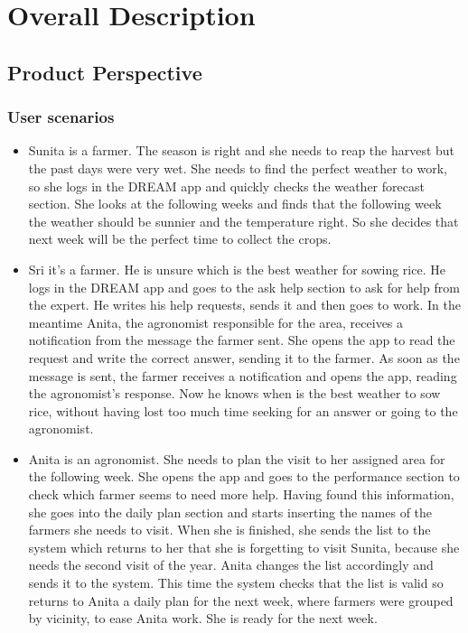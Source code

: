 \documentclass{article}
\begin{document}
\newpage





\section{Overall Description}

\subsection{Product Perspective}

\subsubsection{User scenarios}

    \begin{itemize}
        \item Sunita is a farmer. The season is right and she needs to reap the harvest but the past days were very wet. She needs to find the perfect weather to work, so she logs in the DREAM app and quickly checks the weather forecast section. She looks at the following weeks and finds that the following week the weather should be sunnier and the temperature right. So she decides that next week will be the perfect time to collect the crops.
        
        \item Sri it’s a farmer. He is unsure which is the best weather for sowing rice. He logs in the DREAM app and goes to the ask help section to ask for help from the expert. He writes his help requests, sends it and then goes to work. In the meantime Anita, the agronomist responsible for the area, receives a notification from the message the farmer sent. She opens the app to read the request and write the correct answer, sending it to the farmer. As soon as the message is sent, the farmer receives a notification and opens the app, reading the agronomist's response. Now he knows when is the best weather to sow rice, without having lost too much time seeking for an answer or going to the agronomist.
        
        \item Anita is an agronomist. She needs to plan the visit to her assigned area for the following week. She opens the app and goes to the performance section to check which farmer seems to need more help. Having found this information, she goes into the daily plan section and starts inserting the names of the farmers she needs to visit. When she is finished, she sends the list to the system which returns to her that she is forgetting to visit Sunita, because she needs the second visit of the year. Anita changes the list accordingly and sends it to the system. This time the system checks that the list is valid so returns to Anita a daily plan for the next week, where farmers were grouped by vicinity, to ease Anita work. She is ready for the next week.
        

\end{itemize}
\end{document}
